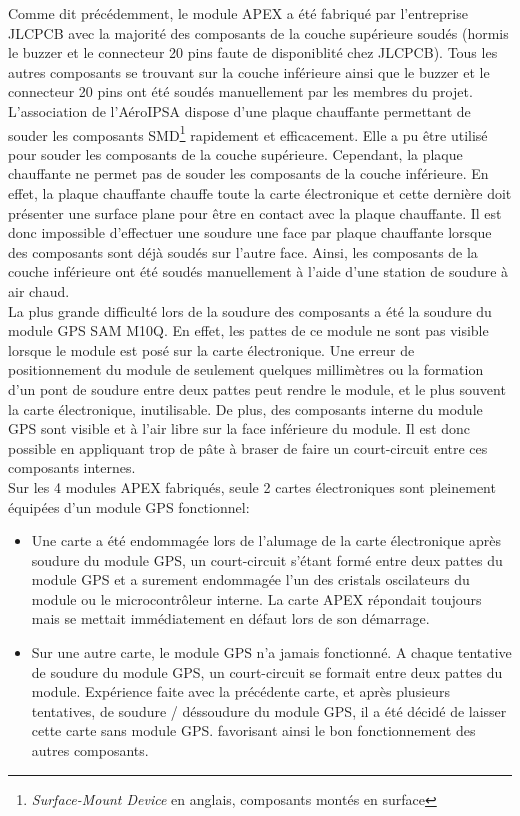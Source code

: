 \documentclass{article}
\begin{document}
Comme dit précédemment, le module APEX a été fabriqué par l'entreprise JLCPCB avec la
majorité des composants de la couche supérieure soudés (hormis le buzzer et le connecteur
20 pins faute de disponiblité chez JLCPCB). Tous les autres composants se trouvant sur la
couche inférieure ainsi que le buzzer et le connecteur 20 pins ont été soudés manuellement
par les membres du projet. L'association de l'AéroIPSA dispose d'une plaque chauffante
permettant de souder les composants SMD\footnote{\textit{Surface-Mount Device} en anglais,
composants montés en surface} rapidement et efficacement. Elle a pu être utilisé pour
souder les composants de la couche supérieure. Cependant, la plaque chauffante ne
permet pas de souder les composants de la couche inférieure. En effet, la plaque
chauffante chauffe toute la carte électronique et cette dernière doit présenter une
surface plane pour être en contact avec la plaque chauffante. Il est donc impossible
d'effectuer une soudure une face par plaque chauffante lorsque des composants sont déjà
soudés sur l'autre face. Ainsi, les composants de la couche inférieure ont été soudés
manuellement à l'aide d'une station de soudure à air chaud.\\

La plus grande difficulté lors de la soudure des composants a été la soudure du module GPS
SAM M10Q. En effet, les pattes de ce module ne sont pas visible lorsque le module est
posé sur la carte électronique. Une erreur de positionnement du module de seulement
quelques millimètres ou la formation d'un pont de soudure entre deux pattes peut rendre le
module, et le plus souvent la carte électronique, inutilisable. De plus, des composants
interne du module GPS sont visible et à l'air libre sur la face inférieure du module. Il
est donc possible en appliquant trop de pâte à braser de faire un court-circuit entre ces
composants internes.\\

Sur les 4 modules APEX fabriqués, seule 2 cartes électroniques sont pleinement équipées
d'un module GPS fonctionnel:\\
\begin{itemize}
\item Une carte a été endommagée lors de l'alumage de la carte
électronique après soudure du module GPS, un court-circuit s'étant formé entre deux
pattes du module GPS et a surement endommagée l'un des cristals oscilateurs du module
ou le microcontrôleur interne. La carte APEX répondait toujours mais se mettait
immédiatement en défaut lors de son démarrage.\\
\item Sur une autre carte, le module GPS n'a jamais fonctionné. A chaque tentative
de soudure du module GPS, un court-circuit se formait entre deux pattes du module.
Expérience faite avec la précédente carte, et après plusieurs tentatives, de soudure /
déssoudure du module GPS, il a été décidé de laisser cette carte sans module GPS.
favorisant ainsi le bon fonctionnement des autres composants.\\
\end{itemize}
\end{document}
